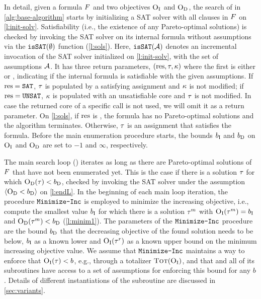 In detail, given a formula $F$ and two objectives $\textsc{O}_{\text{I}}$ and $\textsc{O}_{\text{D}}$, the search of \algname{} in \cref{alg:base-algorithm} starts by initializing a SAT solver with all clauses in $F$ on \cref{l:init-solv}.
Satisfiability (i.e., the existence of any Pareto-optimal solutions) is checked by invoking the SAT solver on its internal formula without assumptions via the $\texttt{isSAT}(\emptyset)$ function (\cref{l:sols}).
Here, $\texttt{isSAT}(\mathcal{A})$ denotes an incremental invocation of the SAT solver initialized on \cref{l:init-solv}, with the set of assumptions $\mathcal{A}$.
It has three return parameters, $(\text{res},\tau,\kappa)$ where the first is either \sat{} or \unsat{}, indicating if the internal formula is satisfiable with the given assumptions.
If $\text{res}=\texttt{SAT}$, $\tau$ is populated by a satisfying assignment and $\kappa$ is not modified;
if $\text{res}=\texttt{UNSAT}$, $\kappa$ is populated with an unsatisfiable core and $\tau$ is not modified.
In case the returned core of a specific call is not used, we will omit it as a return parameter.
On \cref{l:sols}, if $\text{res}$ is \unsat{}, the formula has no Pareto-optimal solutions and the algorithm terminates.
Otherwise, $\tau$ is an assignment that satisfies the formula.
Before the main enumeration procedure starts, the bounds $b_{\text{I}}$ and $b_{\text{D}}$ on $\textsc{O}_{\text{I}}$ and $\textsc{O}_{\text{D}}$ are set to $-1$ and $\infty$, respectively.

The main search loop () iterates as long as there are Pareto-optimal solutions of $F$ that have not been enumerated yet. 
This is the case if there is a solution $\tau$ for which $\textsc{O}_{\text{D}}(\tau) < b_{\text{D}}$, checked by invoking the SAT solver under the assumption $\langle \textsc{O}_{\text{D}} < b_{\text{D}} \rangle$ on \cref{l:endL}.
In the beginning of each main loop iteration, the procedure $\texttt{Minimize-\allowbreak{}Inc}$ is employed to minimize the increasing objective, i.e., compute the smallest value $b_{\text{I}}$ for which there is a solution $\tau^m$ with $\textsc{O}_{\text{I}}(\tau^m) = b_{\text{I}}$ and $\textsc{O}_{\text{D}}(\tau^m) < b_{\text{D}}$ (\cref{l:minim1}). 
The parameters of the $\texttt{Minimize-\allowbreak{}Inc}$ procedure are the bound $b_{\text{D}}$ that the decreasing objective of the found solution needs to be below, $b_{\text{I}}$ as a known lower and $\textsc{O}_{\text{I}}(\tau^r)$ as a known upper bound on the minimum increasing objective value.
We assume that $\texttt{Minimize-\allowbreak{}Inc}$ maintains a way to enforce that $\textsc{O}_{\text{I}}(\tau) < b$, e.g., through a totalizer $\textsc{Tot}(\textsc{O}_{\text{I}})$, and that \algname{} and all of its subroutines have access to a set of assumptions for enforcing this bound for any $b$.
Details of different instantiations of the \Min{} subroutine are discussed in \cref{sec:variants}.

